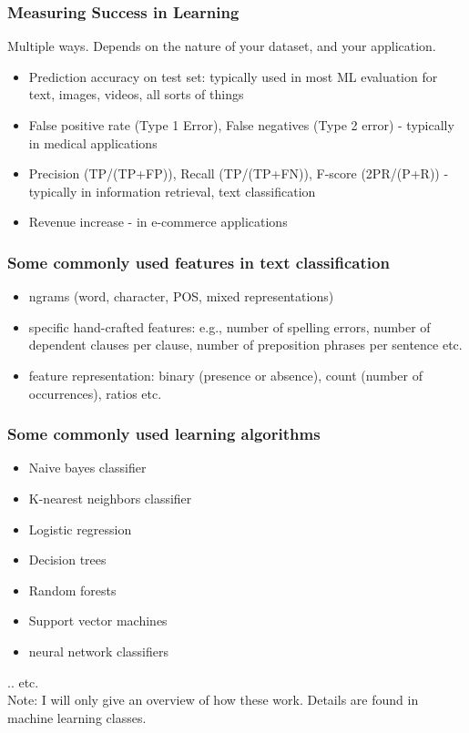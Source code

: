 \documentclass{beamer}
\begin{document}
\begin{frame}
\frametitle{Measuring Success in Learning}
Multiple ways. Depends on the nature of your dataset, and your application.
\begin{itemize}
\item Prediction accuracy on test set: typically used in most ML evaluation for text, images, videos, all sorts of things
\item False positive rate (Type 1 Error), False negatives (Type 2 error) - typically in medical applications
\item Precision (TP/(TP+FP)), Recall (TP/(TP+FN)), F-score (2PR/(P+R)) - typically in information retrieval, text classification
\item Revenue increase - in e-commerce applications
\end{itemize}
\end{frame}

\begin{frame}
\frametitle{Some commonly used features in text classification}
\begin{itemize}
\item ngrams (word, character, POS, mixed representations)
\item specific hand-crafted features: e.g., number of spelling errors, number of dependent clauses per clause, number of preposition phrases per sentence etc.
\item feature representation: binary (presence or absence), count (number of occurrences), ratios etc.
\end{itemize}
\end{frame}

\begin{frame}
\frametitle{Some commonly used learning algorithms}
\begin{itemize}
\item Naive bayes classifier
\item K-nearest neighbors classifier
\item Logistic regression
\item Decision trees
\item Random forests
\item Support vector machines
\item neural network classifiers
\end{itemize}
.. etc. \\ Note: I will only give an overview of how these work. Details are found in machine learning classes.
\end{frame}
\end{document}
